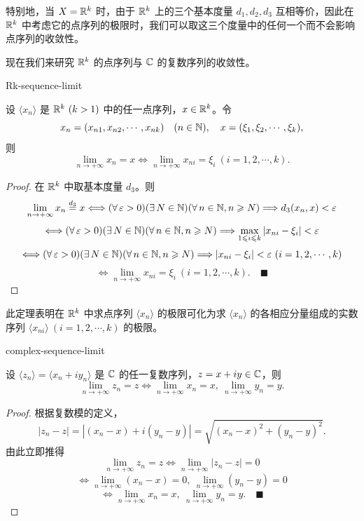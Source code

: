 特别地，当 $X=\mathbb{R}^k$ 时，由于 $\mathbb{R}^k$ 上的三个基本度量 $d_1,d_2,d_3$ 互相等价，因此在 $\mathbb{R}^k$ 中考虑它的点序列的极限时，我们可以取这三个度量中的任何一个而不会影响点序列的收敛性。

现在我们来研究 $\mathbb{R}^k$ 的点序列与 $\mathbb{C}$ 的复数序列的收敛性。

\begin{mythm}{}{Rk-sequence-limit}

设 $\langle x_n\rangle$ 是 $\mathbb{R}^k\ (k>1)$ 中的任一点序列，$x\in\mathbb{R}^k$。令
\[x_n=(x_{n1},x_{n2},\cdots,x_{nk})\quad(n\in\mathbb{N}),\quad x=(\xi_1,\xi_2,\cdots,\xi_k),\]
则
\[\lim_{n\to+\infty}x_n=x\Longleftrightarrow\lim_{n\to+\infty}x_{ni}=\xi_i\ (i=1,2,\cdots,k).\]

\end{mythm}

\begin{proof}

在 $\mathbb{R}^k$ 中取基本度量 $d_3$。则
\[\lim_{n\to+\infty}x_n\stackrel{d_3}{=}x\Longleftrightarrow(\forall\,\varepsilon>0)(\exists\,N\in\mathbb{N})(\forall\,n\in\mathbb{N},n\geqslant N)\Longrightarrow d_3(x_n,x)<\varepsilon\]
\[\Longleftrightarrow(\forall\,\varepsilon>0)(\exists\,N\in\mathbb{N})(\forall\,n\in\mathbb{N},n\geqslant N)\Longrightarrow\max_{1\leqslant i\leqslant k}|x_{ni}-\xi_i|<\varepsilon\]
\[\Longleftrightarrow(\forall\,\varepsilon>0)(\exists\,N\in\N)(\forall\,n\in\N,n\geqslant N)\Longrightarrow|x_{ni}-\xi_i|<\varepsilon\ (i=1,2,\cdots,k)\]
\[\Longleftrightarrow\lim_{n\to+\infty}x_{ni}=\xi_i\ (i=1,2,\cdots,k).\quad\blacksquare\]

\end{proof}

此定理表明在 $\mathbb{R}^k$ 中求点序列 $\langle x_n\rangle$ 的极限可化为求 $\langle x_n\rangle$ 的各相应分量组成的实数序列 $\langle x_{ni}\rangle\ (i=1,2,\cdots,k)$ 的极限。

\begin{mythm}{}{complex-sequence-limit}

设 $\langle z_n\rangle=\langle x_n+iy_n\rangle$ 是 $\mathbb{C}$ 的任一复数序列，$z=x+iy\in\mathbb{C}$，则
\[\lim_{n\to+\infty}z_n=z\Longleftrightarrow\lim_{n\to+\infty}x_n=x,\ \lim_{n\to+\infty}y_n=y.\]

\end{mythm}

\begin{proof}

根据复数模的定义，
\[|z_n-z|=|(x_n-x)+i(y_n-y)|=\sqrt{(x_n-x)^2+(y_n-y)^2}.\]
由此立即推得
\[\lim_{n\to+\infty}z_n=z\Longleftrightarrow\lim_{n\to+\infty}|z_n-z|=0\]
\[\Longleftrightarrow\lim_{n\to+\infty}(x_n-x)=0,\ \lim_{n\to+\infty}(y_n-y)=0\]
\[\Longleftrightarrow\lim_{n\to+\infty}x_n=x,\ \lim_{n\to+\infty}y_n=y.\quad\blacksquare\]

\end{proof}

